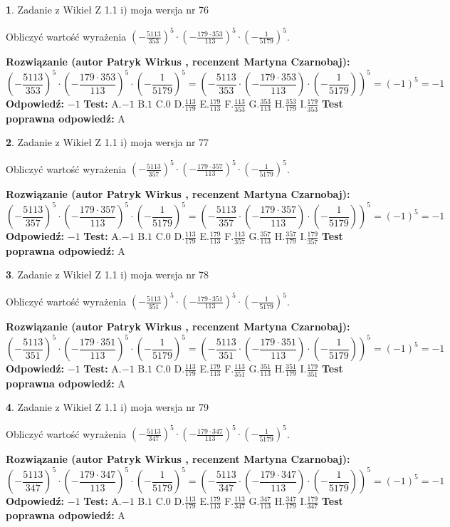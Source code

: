 \documentclass[12pt, a4paper]{article}
\theoremstyle{definition} %
\newtheorem{zad}{}
\newcommand{\zadStart}[1]{\begin{zad}#1\newline}
\newcommand{\zadStop}{\end{zad}}
\newcommand{\rozwStart}[2]{\noindent \textbf{Rozwiązanie (autor #1 , recenzent #2): }\newline}
\newcommand{\rozwStop}{\newline}
\newcommand{\odpStart}{\noindent \textbf{Odpowiedź:}\newline}
\newcommand{\odpStop}{\newline}
\newcommand{\testStart}{\noindent \textbf{Test:}\newline}
\newcommand{\testStop}{\newline}
\newcommand{\kluczStart}{\noindent \textbf{Test poprawna odpowiedź:}\newline}
\newcommand{\kluczStop}{\newline}
\begin{document}
\zadStart{Zadanie z Wikieł Z 1.1 i) moja wersja nr 76}

Obliczyć wartość wyrażenia $(-\frac{5113}{353})^{5} \cdot (-\frac{179 \cdot 353}{113})^{5} \cdot (-\frac{1}{5179})^{5}$.
\zadStop
\rozwStart{Patryk Wirkus}{Martyna Czarnobaj}
$$(-\frac{5113}{353})^{5} \cdot (-\frac{179 \cdot 353}{113})^{5} \cdot (-\frac{1}{5179})^{5} = (-\frac{5113}{353} \cdot (-\frac{179 \cdot 353}{113}) \cdot (-\frac{1}{5179}))^{5} = (-1)^{5} = -1$$
\rozwStop
\odpStart
$-1$
\odpStop
\testStart
A.$-1$ B.$1$ C.$0$ D.$\frac{113}{179}$ E.$\frac{179}{113}$
F.$\frac{113}{353}$ G.$\frac{353}{113}$
H.$\frac{353}{179}$
I.$\frac{179}{353}$
\testStop
\kluczStart
A
\kluczStop



\zadStart{Zadanie z Wikieł Z 1.1 i) moja wersja nr 77}

Obliczyć wartość wyrażenia $(-\frac{5113}{357})^{5} \cdot (-\frac{179 \cdot 357}{113})^{5} \cdot (-\frac{1}{5179})^{5}$.
\zadStop
\rozwStart{Patryk Wirkus}{Martyna Czarnobaj}
$$(-\frac{5113}{357})^{5} \cdot (-\frac{179 \cdot 357}{113})^{5} \cdot (-\frac{1}{5179})^{5} = (-\frac{5113}{357} \cdot (-\frac{179 \cdot 357}{113}) \cdot (-\frac{1}{5179}))^{5} = (-1)^{5} = -1$$
\rozwStop
\odpStart
$-1$
\odpStop
\testStart
A.$-1$ B.$1$ C.$0$ D.$\frac{113}{179}$ E.$\frac{179}{113}$
F.$\frac{113}{357}$ G.$\frac{357}{113}$
H.$\frac{357}{179}$
I.$\frac{179}{357}$
\testStop
\kluczStart
A
\kluczStop



\zadStart{Zadanie z Wikieł Z 1.1 i) moja wersja nr 78}

Obliczyć wartość wyrażenia $(-\frac{5113}{351})^{5} \cdot (-\frac{179 \cdot 351}{113})^{5} \cdot (-\frac{1}{5179})^{5}$.
\zadStop
\rozwStart{Patryk Wirkus}{Martyna Czarnobaj}
$$(-\frac{5113}{351})^{5} \cdot (-\frac{179 \cdot 351}{113})^{5} \cdot (-\frac{1}{5179})^{5} = (-\frac{5113}{351} \cdot (-\frac{179 \cdot 351}{113}) \cdot (-\frac{1}{5179}))^{5} = (-1)^{5} = -1$$
\rozwStop
\odpStart
$-1$
\odpStop
\testStart
A.$-1$ B.$1$ C.$0$ D.$\frac{113}{179}$ E.$\frac{179}{113}$
F.$\frac{113}{351}$ G.$\frac{351}{113}$
H.$\frac{351}{179}$
I.$\frac{179}{351}$
\testStop
\kluczStart
A
\kluczStop



\zadStart{Zadanie z Wikieł Z 1.1 i) moja wersja nr 79}

Obliczyć wartość wyrażenia $(-\frac{5113}{347})^{5} \cdot (-\frac{179 \cdot 347}{113})^{5} \cdot (-\frac{1}{5179})^{5}$.
\zadStop
\rozwStart{Patryk Wirkus}{Martyna Czarnobaj}
$$(-\frac{5113}{347})^{5} \cdot (-\frac{179 \cdot 347}{113})^{5} \cdot (-\frac{1}{5179})^{5} = (-\frac{5113}{347} \cdot (-\frac{179 \cdot 347}{113}) \cdot (-\frac{1}{5179}))^{5} = (-1)^{5} = -1$$
\rozwStop
\odpStart
$-1$
\odpStop
\testStart
A.$-1$ B.$1$ C.$0$ D.$\frac{113}{179}$ E.$\frac{179}{113}$
F.$\frac{113}{347}$ G.$\frac{347}{113}$
H.$\frac{347}{179}$
I.$\frac{179}{347}$
\testStop
\kluczStart
A
\kluczStop
\end{document}
